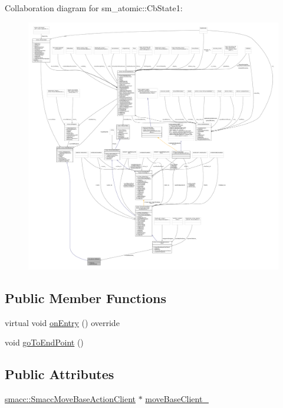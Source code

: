 Collaboration diagram for sm\+\_\+atomic\+:\+:Cb\+State1\+:
\nopagebreak
\begin{figure}[H]
\begin{center}
\leavevmode
\includegraphics[width=350pt]{structsm__atomic_1_1CbState1__coll__graph}
\end{center}
\end{figure}
\subsection*{Public Member Functions}
\begin{DoxyCompactItemize}
\item 
virtual void \hyperlink{structsm__atomic_1_1CbState1_afdd883f27c415d8485658c74fae1008e}{on\+Entry} () override
\item 
void \hyperlink{structsm__atomic_1_1CbState1_ae27f060a983c1128d3c928eed45eae6b}{go\+To\+End\+Point} ()
\end{DoxyCompactItemize}
\subsection*{Public Attributes}
\begin{DoxyCompactItemize}
\item 
\hyperlink{classsmacc_1_1SmaccMoveBaseActionClient}{smacc\+::\+Smacc\+Move\+Base\+Action\+Client} $\ast$ \hyperlink{structsm__atomic_1_1CbState1_a55e7ec48d2662baa9c40ee3c54fb5a64}{move\+Base\+Client\+\_\+}
\end{DoxyCompactItemize}



